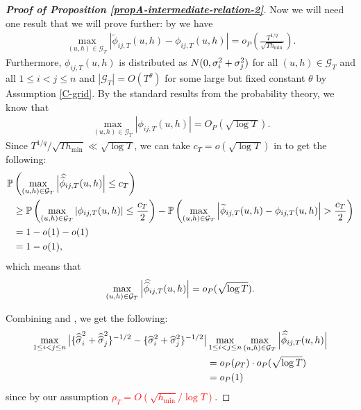 \documentclass[a4paper,12pt]{article}
\makeatletter
\renewcommand{\eqref}[1]{\tagform@{\ref{#1}}}
\newcommand{\doublehat}[1]{\skew{5.5}\widehat{\widehat{#1}}}
\newcommand{\doublehattwo}[1]{\widehat{\widehat{#1}}}
\makeatother
\begin{document}
\begin{proof}[\textnormal{\textbf{Proof of Proposition \ref{propA-intermediate-relation-2}}}]
Now we will need one result that we will prove further: by \eqref{eq-strongapprox-bound5} we have
\begin{align*}
\max_{(u,h) \in \mathcal{G}_T}\left|\widetilde{\phi}_{ij, T}(u, h) - \phi_{ij, T}(u, h)\right| = o_P\left(\frac{T^{1/q}}{\sqrt{Th_{\min}}}\right).
\end{align*}
Furthermore, $\phi_{ij, T}(u,h)$ is distributed as $ N(0,{\sigma}^2_i + {\sigma}^2_j)$ for all $(u,h) \in \mathcal{G}_T$ and all $1\le i < j \le n$ and $|\mathcal{G}_T| = O(T^\theta)$ for some large but fixed constant $\theta$ by Assumption \ref{C-grid}. By the standard results from the probability theory, we know that
\begin{align*}
\max_{(u,h) \in \mathcal{G}_T}\left|\phi_{ij, T}(u, h)\right| = O_P(\sqrt{\log{T}}).
\end{align*}
Since $T^{1/q}/\sqrt{T h_{\min}} \ll \sqrt{\log T}$, we can take $c_T = o(\sqrt{\log{T}})$ in \eqref{ineq-diff-3} to get the following:
\begin{align*}
\pr&\left(\max_{(u,h) \in \mathcal{G}_T}\Big|\doublehat{\phi}_{ij, T}(u, h)\Big| \leq c_T\right)\\
&\geq \pr \left(\max_{(u,h) \in \mathcal{G}_T}\left|\phi_{ij, T}(u, h)\right| \leq \frac{c_T}{2}\right) - \pr\left(\max_{(u,h) \in \mathcal{G}_T}\left|\widetilde{\phi}_{ij, T}(u, h) - \phi_{ij, T}(u, h)\right| > \frac{c_T}{2} \right)  \\
&= 1 - o(1) - o(1) \\
&= 1 - o(1),
\end{align*}
which means that
\begin{align}\label{ineq-diff-4}
\max_{(u,h) \in \mathcal{G}_T}\Big|\doublehat{\phi}_{ij, T}(u, h)\Big| =o_P(\sqrt{\log{T}}).
\end{align}

Combining \eqref{ineq-diff-2} and \eqref{ineq-diff-4}, we get the following:
\begin{align}\label{ineq-diff-5}
\begin{split}
\max_{1 \le i < j \le n} \big|\{\doublehattwo{\sigma}_i^2 + \doublehattwo{\sigma}_j^2 \}^{-1/2} - \{\widehat{\sigma}_i^2 + \widehat{\sigma}_j^2 \}^{-1/2}\big|&\max_{1 \le i< j \le n} \max_{(u,h) \in \mathcal{G}_T} \Big|\doublehat{\phi}_{ij,T}(u,h)\Big| \\
&= o_P(\rho_T) \cdot o_P(\sqrt{\log{T}}) \\
& = o_P(1)
\end{split}
\end{align}
since by our assumption \textcolor{red}{ $\rho_T = O(\sqrt{h_{\min}}/\log T)$}.


\end{proof}
\end{document}
